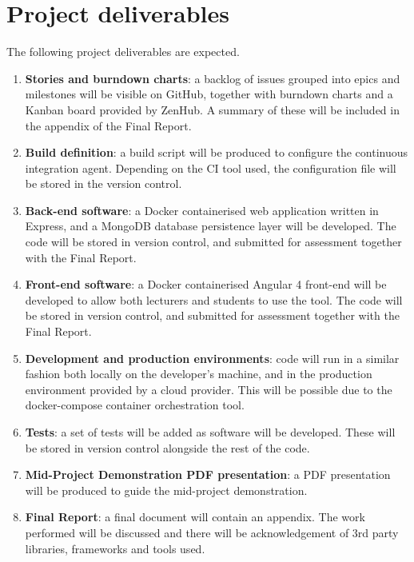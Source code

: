 \documentclass[11pt,fleqn,twoside]{article}
\begin{document}
\section{Project deliverables}
The following project deliverables are expected.
\begin{enumerate}
  \item \textbf{Stories and burndown charts}: a backlog of issues grouped into epics and milestones will be
    visible on GitHub, together with burndown charts and a Kanban board provided by ZenHub\cite{11}. A summary of these
    will be included in the appendix of the Final Report.
  \item \textbf{Build definition}: a build script will be produced to configure the continuous integration agent.
    Depending on the CI tool used, the configuration file will be stored in the version control.
  \item \textbf{Back-end software}: a Docker containerised web application written in Express, and a MongoDB database
    persistence layer will be developed. The code will be stored in version control, and submitted for assessment
    together with the Final Report.
  \item \textbf{Front-end software}: a Docker containerised Angular 4 front-end will be developed to allow both
    lecturers and students to use the tool. The code will be stored in version control, and submitted for assessment
    together with the Final Report.
  \item \textbf{Development and production environments}: code will run in a similar fashion both locally on the developer's
    machine, and in the production environment provided by a cloud provider. This will be possible due to the docker-compose
    container orchestration tool.
  \item \textbf{Tests}: a set of tests will be added as software will be developed. These will be stored in version
    control alongside the rest of the code.
  \item \textbf{Mid-Project Demonstration PDF presentation}: a PDF presentation will be produced to guide the
    mid-project demonstration.
  \item \textbf{Final Report}: a final document will contain an appendix. The work performed will be
    discussed and there will be acknowledgement of 3rd party libraries, frameworks and tools used.

\end{enumerate}
\end{document}
